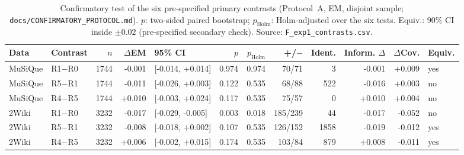 \begin{table}[t]
\centering
\footnotesize
\begin{adjustbox}{max width=\linewidth}
\begin{tabular}{@{}llrrlrrrrrrl@{}}
\toprule
Data & Contrast & $n$ & $\Delta$EM & 95\% CI & $p$ & $p_{\text{Holm}}$ & +/$-$ & Ident. & Inform. $\Delta$ & $\Delta$Cov. & Equiv. \\
\midrule
MuSiQue & R1$-$R0 & 1744 & -0.001 & [-0.014, +0.014] & 0.974 & 0.974 & 70/71 & 3 & -0.001 & +0.009 & yes \\
MuSiQue & R5$-$R1 & 1744 & -0.011 & [-0.026, +0.003] & 0.122 & 0.535 & 68/88 & 522 & -0.016 & +0.003 & no \\
MuSiQue & R4$-$R5 & 1744 & +0.010 & [-0.003, +0.024] & 0.117 & 0.535 & 75/57 & 0 & +0.010 & +0.004 & no \\
2Wiki & R1$-$R0 & 3232 & -0.017 & [-0.029, -0.005] & 0.003 & 0.018 & 185/239 & 44 & -0.017 & -0.052 & no \\
2Wiki & R5$-$R1 & 3232 & -0.008 & [-0.018, +0.002] & 0.107 & 0.535 & 126/152 & 1858 & -0.019 & -0.012 & yes \\
2Wiki & R4$-$R5 & 3232 & +0.006 & [-0.002, +0.015] & 0.174 & 0.535 & 103/84 & 879 & +0.008 & -0.011 & yes \\
\bottomrule
\end{tabular}
\end{adjustbox}
\caption{Confirmatory test of the six pre-specified primary contrasts (Protocol~A, EM, disjoint sample; \texttt{docs/CONFIRMATORY\_PROTOCOL.md}). $p$: two-sided paired bootstrap; $p_{\text{Holm}}$: Holm-adjusted over the six tests. Equiv.: 90\% CI inside $\pm0.02$ (pre-specified secondary check). Source: \texttt{F\_exp1\_contrasts.csv}.}
\label{tab:confirmatory}
\end{table}
